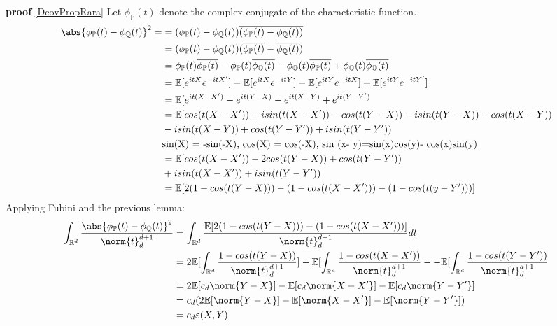 \textbf{proof}
\ref{DcovPropRara} Let $\overline{\phi_{\mathbb{P}}(t)}$ denote the complex conjugate of the characteristic function.\label{DcovDemRara}
\begin{equation}{}
\begin{split}
\abs{\phi_{\mathbb{P}}(t)-\phi_{\mathbb{Q}}(t)}^{2} = 
& = (\phi_{\mathbb{P}}(t)-\phi_{\mathbb{Q}}(t))\overline{(\phi_{\mathbb{P}}(t)-\phi_{\mathbb{Q}}(t))} \\
& = (\phi_{\mathbb{P}}(t)-\phi_{\mathbb{Q}}(t))(\overline{\phi_{\mathbb{P}}(t)}-\overline{\phi_{\mathbb{Q}}(t)})\\
&= \phi_{\mathbb{P}}(t)\overline{\phi_{\mathbb{P}}(t)} - \phi_{\mathbb{P}}(t)\overline{\phi_{\mathbb{Q}}(t)} - \phi_{\mathbb{Q}}(t)\overline{\phi_{\mathbb{P}}(t)} + 
\phi_{\mathbb{Q}}(t)\overline{\phi_{\mathbb{Q}}(t)} \\
&=\mathbb{E}[e^{itX}e^{-itX'}]-\mathbb{E}[e^{itX}e^{-itY}]
-\mathbb{E}[e^{itY}e^{-itX}] + \mathbb{E}[e^{itY}e^{-itY'}]\\
&=\mathbb{E}[e^{it(X-X')}-e^{it(Y-X)}-e^{it(X-Y)}+e^{it(Y-Y')} \\
&=\mathbb{E}[cos(t(X-X')) + isin(t(X-X'))-cos(t(Y-X))-isin(t(Y-X)) -cos(t(X-Y)) \\
&-isin(t(X-Y)) + cos(t(Y-Y'))+isin(t(Y-Y')) \\
&\text{sin(X) = -sin(-X), cos(X) = cos(-X), sin (x- y)=sin(x)cos(y)- cos(x)sin(y)}\\
&=\mathbb{E}[cos(t(X-X')) - 2cos(t(Y-X)) + cos(t(Y-Y')) \\
& + isin(t(X-X')) + isin(t(Y-Y'))\\
&= \mathbb{E}[2(1-cos(t(Y-X)))-(1-cos(t(X-X')))-(1-cos(t(y-Y')))]
\end{split}
\end{equation}
Applying Fubini and the previous lemma:
\begin{equation}{}
\begin{split}
\int_{\mathbb{R}^{d}}\frac{\abs{\phi_{\mathbb{P}}(t)-\phi_{\mathbb{Q}}(t)}^{2}}{\norm{t}^{d+1}_{d}}
&=\int_{\mathbb{R}^{d}}\frac{\mathbb{E}[2(1-cos(t(Y-X)))-(1-cos(t(X-X')))]}{\norm{t}^{d+1}_{d}} dt \\
&=2\mathbb{E}[\int_{\mathbb{R}^{d}}\frac{1-cos(t(Y-X))}{\norm{t}^{d+1}_{d}}] - \mathbb{E}[\int_{\mathbb{R}^{d}}\frac{1-cos(t(X-X'))}{\norm{t}^{d+1}_{d}} - - \mathbb{E}[\int_{\mathbb{R}^{d}}\frac{1-cos(t(Y-Y'))}{\norm{t}^{d+1}_{d}} \\
&=2\mathbb{E}[c_{d}\norm{Y-X}] - \mathbb{E}[c_{d}\norm{X-X'}] -\mathbb{E}[c_{d}\norm{Y-Y'}] \\
&= c_{d}(2\mathbb{E}[\norm{Y-X}] - \mathbb{E}[\norm{X-X'}] -\mathbb{E}[\norm{Y-Y'}])\\
&= c_{d}\varepsilon(X,Y)
\end{split}
\end{equation}

